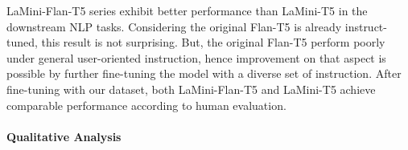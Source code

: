 \documentclass[11pt]{article}
\newcommand{\modelname}{LaMini\xspace}
\begin{document}
\modelname-Flan-T5 series exhibit better performance than \modelname-T5 in the downstream NLP tasks. Considering the original Flan-T5 is already instruct-tuned, this result is not surprising. But, the original Flan-T5 perform poorly under general user-oriented instruction, hence improvement on that aspect is possible by further fine-tuning the model with a diverse set of instruction. After fine-tuning with our dataset, both \modelname-Flan-T5 and \modelname-T5 achieve comparable performance according to human evaluation.





\paragraph{Qualitative Analysis}
\end{document}
